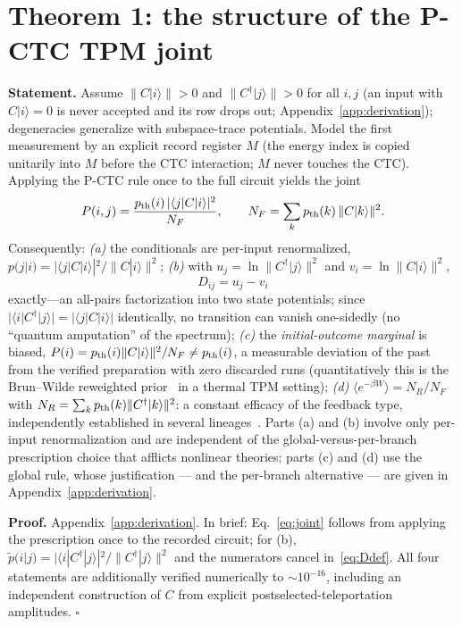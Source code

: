 \documentclass[aps,pra,twocolumn,superscriptaddress,nofootinbib]{revtex4-2}
\begin{document}
\section{Theorem 1: the structure of the P-CTC TPM joint}
\textbf{Statement.} Assume $\lVert C|i\rangle\rVert>0$ and $\lVert C^\dagger|j\rangle\rVert>0$ for all $i,j$ (an input with $C|i\rangle=0$ is never accepted and its row drops out; Appendix~\ref{app:derivation}); degeneracies generalize with subspace-trace potentials. Model the first measurement by an explicit record register $M$ (the energy index is copied unitarily into $M$ before the CTC interaction; $M$ never touches the CTC). Applying the P-CTC rule once to the full circuit yields the joint
\begin{equation}
P(i,j)=\frac{p_{\rm th}(i)\,|\langle j|C|i\rangle|^2}{N_F},\qquad
N_F=\sum_k p_{\rm th}(k)\,\lVert C|k\rangle\rVert^2 .
\label{eq:joint}
\end{equation}
Consequently:
\emph{(a)} the conditionals are per-input renormalized, $p(j|i)=|\langle j|C|i\rangle|^2/\lVert C|i\rangle\rVert^2$;
\emph{(b)} with $u_j=\ln\lVert C^\dagger|j\rangle\rVert^2$ and $v_i=\ln\lVert C|i\rangle\rVert^2$,
\begin{equation}
\boxed{\;D_{ij}=u_j-v_i\;}
\label{eq:factorization}
\end{equation}
exactly---an all-pairs factorization into two state potentials; since $|\langle i|C^\dagger|j\rangle|=|\langle j|C|i\rangle|$ identically, no transition can vanish one-sidedly (no ``quantum amputation'' of the spectrum);
\emph{(c)} the \emph{initial-outcome marginal} is biased,
$P(i)=p_{\rm th}(i)\lVert C|i\rangle\rVert^2/N_F\neq p_{\rm th}(i)$,
a measurable deviation of the past from the verified preparation with zero discarded runs (quantitatively this is the Brun--Wilde reweighted prior~\cite{brunwilde2012} in a thermal TPM setting);
\emph{(d)} $\langle e^{-\beta W}\rangle=N_R/N_F$ with $N_R=\sum_k p_{\rm th}(k)\lVert C^\dagger|k\rangle\rVert^2$: a constant efficacy of the feedback type, independently established in several lineages~\cite{sagawaueda2010,aberg2018,junier2009,malakarsilva2025,cavina2026}. Parts (a) and (b) involve only per-input renormalization and are independent of the global-versus-per-branch prescription choice that afflicts nonlinear theories; parts (c) and (d) use the global rule, whose justification --- and the per-branch alternative --- are given in Appendix~\ref{app:derivation}.

\textbf{Proof.} Appendix~\ref{app:derivation}. In brief: Eq.~\eqref{eq:joint} follows from applying the prescription once to the recorded circuit; for (b), $\tilde p(i|j)=|\langle i|C^\dagger|j\rangle|^2/\lVert C^\dagger|j\rangle\rVert^2$ and the numerators cancel in~\eqref{eq:Ddef}. All four statements are additionally verified numerically to $\sim10^{-16}$, including an independent construction of $C$ from explicit postselected-teleportation amplitudes. $\square$
\end{document}
